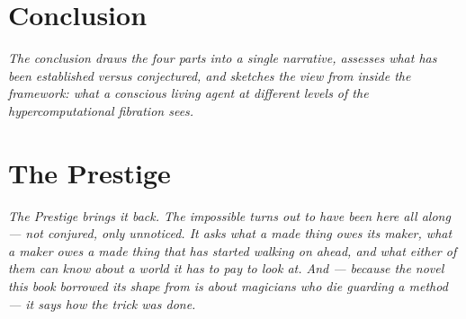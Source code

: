 \documentclass[12pt,openright,twoside]{book}
\theoremstyle{remark}
\theoremstyle{plain}
\theoremstyle{remark}
\theoremstyle{plain}
\theoremstyle{plain}
\begin{document}
\bigskip



\part*{Conclusion}

\vspace{1em}
\begin{mdframed}[backgroundcolor=remarkgray, linecolor=gray!60,
                 linewidth=1pt, topline=false, rightline=false,
                 bottomline=false]
\small\itshape
The conclusion draws the four parts into a single narrative,
assesses what has been established versus conjectured, and
sketches the view from inside the framework: what a conscious
living agent at different levels of the hypercomputational
fibration sees.
\end{mdframed}

\bigskip


\part{The Prestige}

\vspace{1em}
\begin{mdframed}[backgroundcolor=remarkgray, linecolor=gray!60,
                 linewidth=1pt, topline=false, rightline=false,
                 bottomline=false]
\small\itshape
The Prestige brings it back.
The impossible turns out to have been here all along --- not conjured,
only unnoticed.
It asks what a made thing owes its maker, what a maker owes a made
thing that has started walking on ahead, and what either of them can
know about a world it has to pay to look at.
And --- because the novel this book borrowed its shape from is about
magicians who die guarding a method --- it says how the trick was
done.
\end{mdframed}
\end{document}
